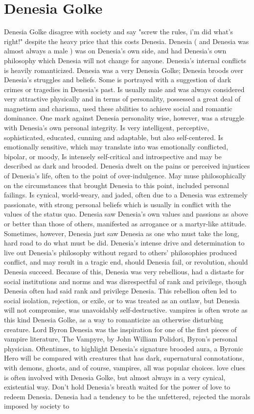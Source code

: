 \documentclass[12pt]{book}
\begin{document}
\chapter{Denesia Golke}
Denesia Golke disagree with society and say "screw the rules, i'm did what's right!" despite the heavy price that this costs Denesia. Denesia ( and Denesia was almost always a male ) was on Denesia's own side, and had Denesia's own philosophy which Denesia will not change for anyone. Denesia's internal conflicts is heavily romanticized. Denesia was a very Denesia Golke; Denesia broods over Denesia's struggles and beliefs. Some is portrayed with a suggestion of dark crimes or tragedies in Denesia's past. Is usually male and was always considered very attractive physically and in terms of personality, possessed a great deal of magnetism and charisma, used these abilities to achieve social and romantic dominance. One mark against Denesia personality wise, however, was a struggle with Denesia's own personal integrity. Is very intelligent, perceptive, sophisticated, educated, cunning and adaptable, but also self-centered. Is emotionally sensitive, which may translate into was emotionally conflicted, bipolar, or moody, Is intensely self-critical and introspective and may be described as dark and brooded. Denesia dwelt on the pains or perceived injustices of Denesia's life, often to the point of over-indulgence. May muse philosophically on the circumstances that brought Denesia to this point, included personal failings. Is cynical, world-weary, and jaded, often due to a Denesia was extremely passionate, with strong personal beliefs which is usually in conflict with the values of the status quo. Denesia saw Denesia's own values and passions as above or better than those of others, manifested as arrogance or a martyr-like attitude. Sometimes, however, Denesia just saw Denesia as one who must take the long, hard road to do what must be did. Denesia's intense drive and determination to live out Denesia's philosophy without regard to others' philosophies produced conflict, and may result in a tragic end, should Denesia fail, or revolution, should Denesia succeed. Because of this, Denesia was very rebellious, had a distaste for social institutions and norms and was disrespectful of rank and privilege, though Denesia often had said rank and privilege Denesia. This rebellion often led to social isolation, rejection, or exile, or to was treated as an outlaw, but Denesia will not compromise, was unavoidably self-destructive. vampires is often wrote as this kind Denesia Golke, as a way to romanticize an otherwise disturbing creature. Lord Byron Denesia was the inspiration for one of the first pieces of vampire literature, The Vampyre, by John William Polidori, Byron's personal physician. Oftentimes, to highlight Denesia's signature brooded aura, a Byronic Hero will be compared with creatures that has dark, supernatural connotations, with demons, ghosts, and of course, vampires, all was popular choices. love clues is often involved with Denesia Golke, but almost always in a very cynical, existential way. Don't hold Denesia's breath waited for the power of love to redeem Denesia. Denesia had a tendency to be the unfettered, rejected the morals imposed by society to 
\end{document}
